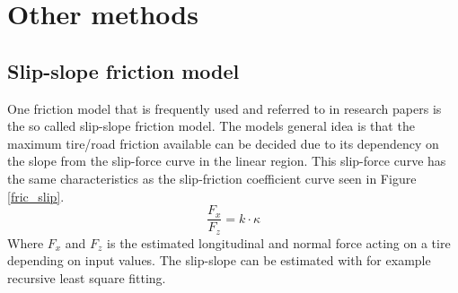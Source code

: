 \section{Other methods}

\subsection{Slip-slope friction model}

One friction model that is frequently used and referred to in research papers is the so called slip-slope friction model. The models general idea is that the maximum tire/road friction available can be decided due to its dependency on the slope from the slip-force curve in the linear region. This slip-force curve has the same characteristics as the slip-friction coefficient curve seen in Figure \ref{fric_slip}. 
\begin{equation}
\dfrac{F_{x}}{F_{z}} = k \cdot \kappa
\end{equation}
Where $ F_{x} $ and $ F_{z} $ is the estimated longitudinal and normal force acting on a tire depending on input values. The slip-slope can be estimated with for example recursive least square fitting.
